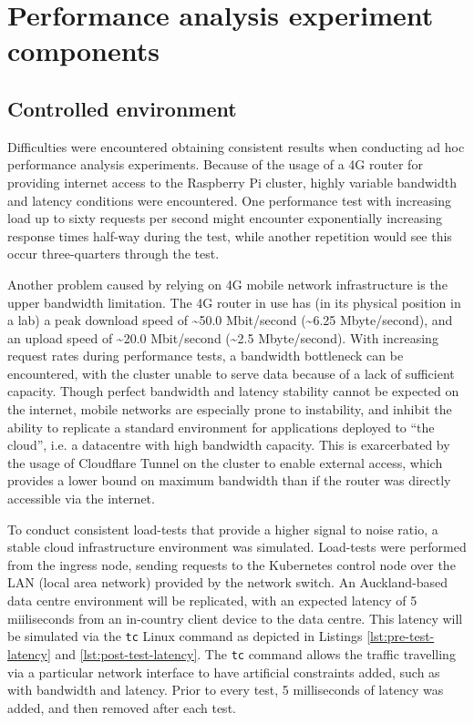 \section{Performance analysis experiment components}
\subsection{Controlled environment}

Difficulties were encountered obtaining consistent results when conducting ad hoc performance analysis experiments. Because of the usage of a 4G router for providing internet access to the Raspberry Pi cluster, highly variable bandwidth and latency conditions were encountered. One performance test with increasing load up to sixty requests per second might encounter exponentially increasing response times half-way during the test, while another repetition would see this occur three-quarters through the test. 

Another problem caused by relying on 4G mobile network infrastructure is the upper bandwidth limitation. The 4G router in use has (in its physical position in a lab) a peak download speed of \textasciitilde50.0 Mbit/second (\textasciitilde6.25 Mbyte/second), and an upload speed of \textasciitilde20.0 Mbit/second (\textasciitilde2.5 Mbyte/second). With increasing request rates during performance tests, a bandwidth bottleneck can be encountered, with the cluster unable to serve data because of a lack of sufficient capacity. Though perfect bandwidth and latency stability cannot be expected on the internet, mobile networks are especially prone to instability, and inhibit the ability to replicate a standard environment for applications deployed to ``the cloud'', i.e. a datacentre with high bandwidth capacity. This is exarcerbated by the usage of Cloudflare Tunnel on the cluster to enable external access, which provides a lower bound on maximum bandwidth than if the router was directly accessible via the internet.

To conduct consistent load-tests that provide a higher signal to noise ratio, a stable cloud infrastructure environment was simulated. Load-tests were performed from the ingress node, sending requests to the Kubernetes control node over the LAN (local area network) provided by the network switch. An Auckland-based data centre environment will be replicated, with an expected latency of 5 miiliseconds from an in-country client device to the data centre. This latency will be simulated via the \verb|tc| Linux command as depicted in Listings \ref{lst:pre-test-latency} and \ref{lst:post-test-latency}. The \verb|tc| command allows the traffic travelling via a particular network interface to have artificial constraints added, such as with bandwidth and latency. Prior to every test, 5 milliseconds of latency was added, and then removed after each test.


